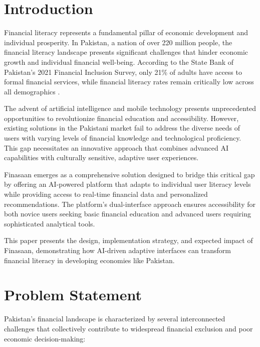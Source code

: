 \documentclass[conference]{IEEEtran}
\begin{document}
\section{Introduction}

Financial literacy represents a fundamental pillar of economic development and individual prosperity. In Pakistan, a nation of over 220 million people, the financial literacy landscape presents significant challenges that hinder economic growth and individual financial well-being. According to the State Bank of Pakistan's 2021 Financial Inclusion Survey, only 21\% of adults have access to formal financial services, while financial literacy rates remain critically low across all demographics \cite{sbp2021}.

The advent of artificial intelligence and mobile technology presents unprecedented opportunities to revolutionize financial education and accessibility. However, existing solutions in the Pakistani market fail to address the diverse needs of users with varying levels of financial knowledge and technological proficiency. This gap necessitates an innovative approach that combines advanced AI capabilities with culturally sensitive, adaptive user experiences.

Finasaan emerges as a comprehensive solution designed to bridge this critical gap by offering an AI-powered platform that adapts to individual user literacy levels while providing access to real-time financial data and personalized recommendations. The platform's dual-interface approach ensures accessibility for both novice users seeking basic financial education and advanced users requiring sophisticated analytical tools.

This paper presents the design, implementation strategy, and expected impact of Finasaan, demonstrating how AI-driven adaptive interfaces can transform financial literacy in developing economies like Pakistan.

\section{Problem Statement}

Pakistan's financial landscape is characterized by several interconnected challenges that collectively contribute to widespread financial exclusion and poor economic decision-making:
\end{document}
